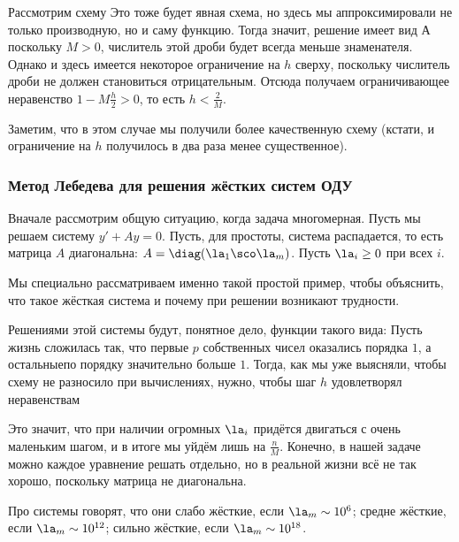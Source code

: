 \documentclass[a4paper]{article}
\begin{document}
\begin{ex}
Рассмотрим схему
Это тоже будет явная схема, но здесь мы аппроксимировали не только производную,
но и саму функцию. Тогда
значит, решение имеет вид
А поскольку $M > 0$, числитель этой дроби будет всегда меньше знаменателя.
Однако и здесь имеется некоторое ограничение на $h$ сверху, поскольку числитель дроби
не должен становиться отрицательным. Отсюда получаем ограничивающее неравенство
$1 - M \frac{h}{2} > 0$, то есть $h < \frac{2}{M}$.

Заметим, что в этом случае мы получили более качественную схему (кстати, и ограничение на $h$ получилось
в два раза менее существенное).
\end{ex}

\subsubsection{Метод Лебедева для решения жёстких систем ОДУ}

Вначале рассмотрим общую ситуацию, когда задача многомерная.
Пусть мы решаем систему $y' + Ay = 0$. Пусть, для простоты,
система распадается, то есть матрица $A$ диагональна:
$A = \diag (\la_1\sco \la_m)$. Пусть $\la_i \ge 0$ при всех $i$.

\begin{note}
Мы специально рассматриваем именно такой простой пример, чтобы объяснить, что такое жёсткая система
и почему при решении возникают трудности.
\end{note}

Решениями этой системы будут, понятное дело, функции такого вида:
Пусть жизнь сложилась так, что первые $p$ собственных чисел оказались порядка $1$,
а остальные\т по порядку значительно больше $1$. Тогда, как мы уже выясняли,
чтобы схему не разносило при вычислениях, нужно, чтобы шаг $h$ удовлетворял неравенствам

Это значит, что при наличии огромных $\la_i$ придётся двигаться с очень маленьким шагом, и в итоге мы уйдём лишь на $\frac nM$.
Конечно, в нашей задаче можно каждое уравнение решать отдельно, но в реальной жизни
всё не так хорошо, поскольку матрица не диагональна.

Про системы говорят, что они слабо жёсткие, если $\la_m \sim 10^6$; средне жёсткие, если $\la_m \sim 10^{12}$;
сильно жёсткие, если $\la_m \sim 10^{18}$.
\end{document}
